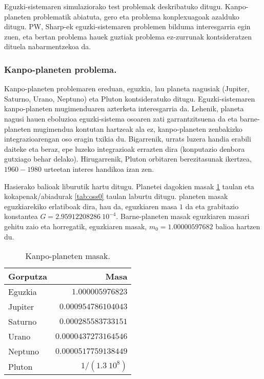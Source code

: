 Eguzki-sistemaren simulaziorako test problemak deskribatuko ditugu. Kanpo-planeten problematik abiatuta, gero eta problema konplexuagoak azalduko ditugu. PW, Sharp-ek \cite{Sharp2001} eguzki-sistemaren problemen bilduma interesgarria egin zuen, eta bertan problema hauek guztiak  problema ez-zurrunak kontsideratzen dituela nabarmentzekoa da.


\subsubsection*{Kanpo-planeten problema.}


Kanpo-planeten problemaren ereduan, eguzkia, lau planeta nagusiak (Jupiter, Saturno, Urano, Neptuno) eta Pluton kontsideratuko ditugu. Eguzki-sistemaren kanpo-planeten  mugimenduaren azterketa interesgarria da. Lehenik, planeta nagusi hauen eboluzioa eguzki-sistema osoaren zati garrantzitsuena da eta barne-planeten mugimendua kontutan hartzeak ala ez, kanpo-planeten zenbakizko integrazioarengan oso eragin txikia du. Bigarrenik, urrats luzera handia erabili daiteke eta beraz, epe luzeko integrazioak errazten dira (konputazio denbora gutxiago behar delako). Hirugarrenik, Pluton orbitaren berezitasunak ikertzea,  $1960-1980$ urteetan interes handikoa izan zen.        


Hasierako balioak \cite{Hairer2006} liburutik hartu ditugu. Planetei dagokien masak \ref{tab:ossm0} taulan eta kokapenak/abiadurak \ref{tab:oss0} taulan laburtu ditugu. planeten masak eguzkiarekiko erlatiboak dira, hau da, eguzkiaren masa $1$ da eta grabitazio konstantea $G=2.95912208286 \ 10^{-4}$. Barne-planeten masak eguzkiaren masari gehitu zaio eta horregatik, eguzkiaren masak, $m_0=1.00000597682$ balioa hartzen du.

\begin{table}[h]
\caption{Kanpo-planeten masak.}
\label{tab:ossm0}       %
\centering
\begin{tabular}{ l r }
\hline 
  Gorputza         &  Masa        
\\\hline
  Eguzkia          &  $1.000005976823$ \\
  Jupiter          &  $0.000954786104043$ \\
  Saturno          &  $0.000285583733151$ \\
  Urano            &  $0.0000437273164546$ \\
  Neptuno          &  $0.0000517759138449$ \\
  Pluton           &  ${1}/{(1.3 \ 10^8)}$ \\
\hline  
\end{tabular}
\end{table}

